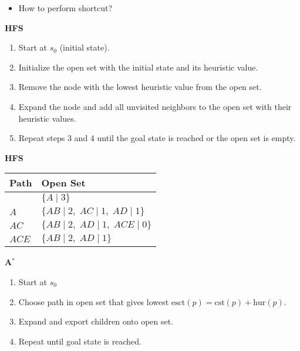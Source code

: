 \begin{warning}
    \begin{itemize}
        \item How to perform shortcut? 
    \end{itemize}
\end{warning}

\begin{process} \textbf{HFS}
    \begin{enumerate}
        \item Start at $s_0$ (initial state).
        \item Initialize the open set with the initial state and its heuristic value.
        \item Remove the node with the lowest heuristic value from the open set.
        \item Expand the node and add all unvisited neighbors to the open set with their heuristic values.
        \item Repeat steps 3 and 4 until the goal state is reached or the open set is empty.
    \end{enumerate}
\end{process}

\begin{example} \textbf{HFS}
    \begin{center}
        \begin{tabular}{ll}
        \toprule
        \textbf{Path} & \textbf{Open Set} \\
        \midrule
         & $\{A \mid 3\}$ \\
        $A$ & $\{AB \mid 2, \; AC \mid 1, \; AD \mid 1\}$ \\
        $AC$ & $\{AB \mid 2, \; AD \mid 1, \; ACE \mid 0\}$ \\
        $ACE$ & $\{AB \mid 2, \; AD \mid 1\}$ \\
        \bottomrule
        \end{tabular}
    \end{center}
\end{example}


\begin{process} \textbf{A$^*$}
    \begin{enumerate}
        \item Start at $s_0$ 
        \item Choose path in open set that gives lowest $\text{esct}(p) = \text{cst}(p) + \text{hur}(p)$.
        \item Expand and export children onto open set.
        \item Repeat until goal state is reached.
    \end{enumerate}
\end{process}

